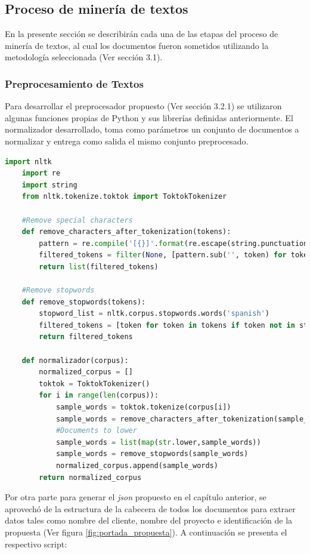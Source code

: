 \subsection{Proceso de minería de textos}
    En la presente sección se describirán cada una de las etapas del proceso de minería de textos, al cual los documentos fueron sometidos utilizando la metodología seleccionada (Ver sección 3.1).

\subsubsection{Preprocesamiento de Textos}
    Para desarrollar el preprocesador propuesto (Ver sección 3.2.1) se utilizaron algunas funciones propias de Python y sus librerías definidas anteriormente. El normalizador desarrollado, toma como parámetros un conjunto de documentos a normalizar y entrega como salida el mismo conjunto preprocesado.  

    \begin{lstlisting}[language=Python]
    import nltk
    import re
    import string
    from nltk.tokenize.toktok import ToktokTokenizer
    
    #Remove special characters
    def remove_characters_after_tokenization(tokens):
        pattern = re.compile('[{}]'.format(re.escape(string.punctuation)))
        filtered_tokens = filter(None, [pattern.sub('', token) for token in tokens])
        return list(filtered_tokens)
    
    #Remove stopwords
    def remove_stopwords(tokens):
        stopword_list = nltk.corpus.stopwords.words('spanish')
        filtered_tokens = [token for token in tokens if token not in stopword_list]
        return filtered_tokens
    
    def normalizador(corpus):
        normalized_corpus = []
        toktok = ToktokTokenizer()
        for i in range(len(corpus)):
            sample_words = toktok.tokenize(corpus[i])
            sample_words = remove_characters_after_tokenization(sample_words)
            #Documents to lower
            sample_words = list(map(str.lower,sample_words))
            sample_words = remove_stopwords(sample_words)
            normalized_corpus.append(sample_words)
        return normalized_corpus
    \end{lstlisting}
    
    Por otra parte para generar el \textit{json} propuesto en el capítulo anterior, se aprovechó de la estructura de la cabecera de todos los documentos para extraer datos tales como nombre del cliente, nombre del proyecto e identificación de la propuesta (Ver figura \ref{fig:portada_propuesta}). A continuación se presenta el respectivo script:
    
